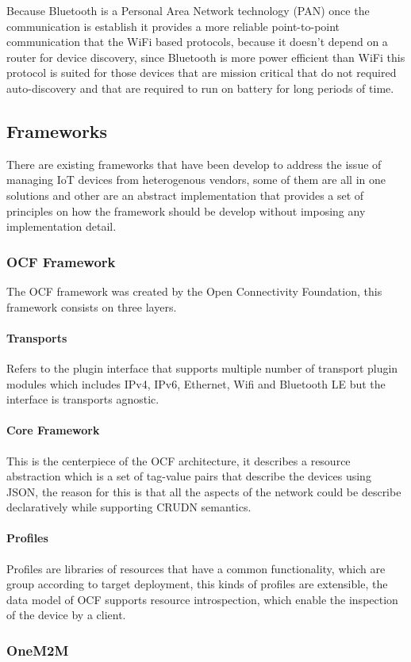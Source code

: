 Because Bluetooth is a Personal Area Network technology (PAN) once the 
communication is establish it provides a more reliable point-to-point 
communication that the WiFi based protocols, because it doesn't depend on a 
router for device discovery, since Bluetooth is more power efficient than 
WiFi this protocol is suited for those devices that are mission critical that 
do not required auto-discovery and that are required to run on battery for 
long periods of time.

\subsection{Frameworks}
There are existing frameworks that have been develop to address the issue of 
managing IoT devices from heterogenous vendors, some of them are all in one 
solutions and other are an abstract implementation that provides a set of 
principles on how the framework should be develop without imposing any 
implementation detail.

\subsubsection{OCF Framework}

The OCF framework was created by the Open Connectivity Foundation, this 
framework consists on three layers.

\paragraph{Transports}
Refers to the plugin interface that supports multiple number of transport 
plugin modules which includes IPv4, IPv6, Ethernet, Wifi and Bluetooth LE but 
the interface is transports agnostic.

\paragraph{Core Framework}
This is the centerpiece of the OCF architecture, it describes a resource 
abstraction which is a set of tag-value pairs that describe the devices 
using JSON, the reason for this is that all the aspects of the network 
could be describe declaratively while supporting CRUDN semantics.

\paragraph{Profiles}
Profiles are libraries of resources that have a common functionality, which 
are group according to target deployment, this kinds of profiles are 
extensible, the data model of OCF supports resource introspection, which 
enable the inspection of the device by a client.

\subsubsection*{OneM2M}